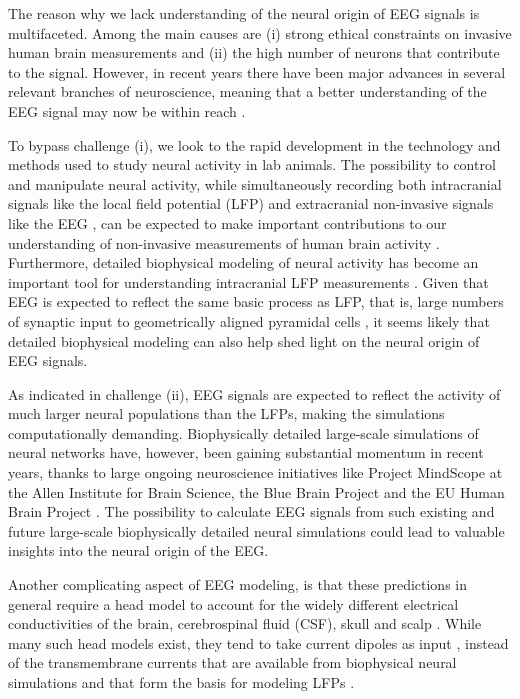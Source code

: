 \documentclass[preprint,10pt,authoryear]{elsarticle}
\newcommand{\hlp}[2][Purple]{ {\sethlcolor{#1} \hl{#2}} }
\newcommand{\gen}[1]{\color{white}{\hlp{GTE: #1 }}\color{black}}
\begin{document}
The reason why we lack understanding of the neural origin of EEG signals is multifaceted. Among the main causes are (i) strong ethical constraints on invasive human brain measurements and (ii) the high number of neurons that contribute to the signal. However, in recent years there have been major advances in several relevant branches of neuroscience, meaning that a better understanding of the EEG signal may now be within reach \citep{Uhlirova2016, COHEN2017}.

To bypass challenge (i), we look to the rapid development in the technology and methods used to study neural activity in lab animals. The possibility to control and manipulate neural activity, while simultaneously recording both intracranial signals like the local field potential (LFP) \citep{Einevoll2007, Blomquist2009} and extracranial non-invasive signals like the EEG \citep{BRUYNS2017}, can be expected to make important contributions to our understanding of non-invasive measurements of human brain activity \citep{SILVA2013, Uhlirova2016, COHEN2017, Pesaran2018}. 
Furthermore, detailed biophysical modeling of neural activity has become an important tool for understanding intracranial LFP measurements \citep{EINEVOLL2013REVIEW, Pesaran2018}. Given that EEG is expected to reflect the same basic process as LFP, that is, large numbers of synaptic input to geometrically aligned pyramidal cells \citep{NUNEZ2006, Pesaran2018, BUZSAKI2012}, 
it seems likely that detailed biophysical modeling can also help shed light on the neural origin of EEG signals.

As indicated in challenge (ii), EEG signals are expected to reflect the activity of much larger neural populations than the LFPs, making the simulations computationally demanding. Biophysically detailed large-scale simulations of neural networks have, however, been gaining substantial momentum in recent years, thanks to large ongoing neuroscience initiatives like Project MindScope at the Allen Institute for Brain Science, the Blue Brain Project
and the EU Human Brain Project \citep{EINEVOLL2019}. The possibility to calculate EEG signals from such existing and future large-scale biophysically detailed neural simulations could lead to valuable insights into the neural origin of the EEG.

Another complicating aspect of EEG modeling, is that these predictions in general require a head model to account for the widely different electrical conductivities of the brain, cerebrospinal fluid (CSF), skull and scalp \citep{NUNEZ2006, Ilmoniemi2019}. While many such head models exist, they tend to take current dipoles as input \citep{NUNEZ2006, Pesaran2018}, instead of the transmembrane currents that are available from biophysical neural simulations and that form the basis for modeling LFPs \citep{EINEVOLL2013BOOKCHAPTER}. 
\end{document}
